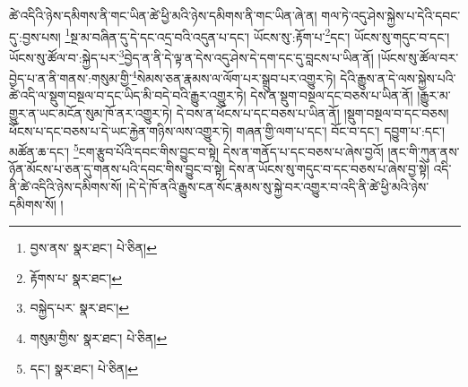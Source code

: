 ཚེ་འདིའི་ཉེས་དམིགས་ནི་གང་ཡིན་ཚེ་ཕྱི་མའི་ཉེས་དམིགས་ནི་གང་ཡིན་ཞེ་ན། གལ་ཏེ་འདུ་ཤེས་སྐྱེས་པ་དེའི་དབང་དུ་:བྱས་པས། \footnote{བྱས་ནས་  སྣར་ཐང་།  པེ་ཅིན། }སྔ་མ་བཞིན་དུ་དེ་དང་འདྲ་བའི་འདུན་པ་དང་། ཡོངས་སུ་:རྟོག་པ་\footnote{རྟོགས་པ་  སྣར་ཐང་། }དང་། ཡོངས་སུ་གདུང་བ་དང་། ཡོངས་སུ་ཚོལ་བ་:སྐྱེད་པར་\footnote{བསྐྱེད་པར་  སྣར་ཐང་། }བྱེད་ན་ནི་དེ་ལྟ་ན་དེས་འདུ་ཤེས་དེ་དག་དང་དུ་བླངས་པ་ཡིན་ནོ། །ཡོངས་སུ་ཚོལ་བར་བྱེད་པ་ན་ནི་གནས་:གསུམ་གྱི་\footnote{གསུམ་གྱིས་  སྣར་ཐང་།  པེ་ཅིན། }སེམས་ཅན་རྣམས་ལ་ལོག་པར་སྒྲུབ་པར་འགྱུར་ཏེ། དེའི་རྒྱུས་ན་དེ་ལས་སྐྱེས་པའི་ཚེ་འདི་ལ་སྡུག་བསྔལ་བ་དང་ཡིད་མི་བདེ་བའི་རྒྱུར་འགྱུར་ཏེ། དེས་ན་སྡུག་བསྔལ་དང་བཅས་པ་ཡིན་ནོ། །རྒྱུར་མ་གྱུར་ན་ཡང་མངོན་སུམ་ཁོ་ནར་འགྱུར་ཏེ། དེ་བས་ན་ཕོངས་པ་དང་བཅས་པ་ཡིན་ནོ། །སྡུག་བསྔལ་བ་དང་བཅས། ཕོངས་པ་དང་བཅས་པ་དེ་ཡང་རྐྱེན་གཉིས་ལས་འགྱུར་ཏེ། གཞན་གྱི་ལག་པ་དང་། བོང་བ་དང་། དབྱུག་པ་:དང་། མཚོན་ཆ་དང་། \footnote{དང་།    སྣར་ཐང་།  པེ་ཅིན། }ངག་རྩུབ་པོའི་དབང་གིས་བྱུང་བ་སྟེ། དེས་ན་གནོད་པ་དང་བཅས་པ་ཞེས་བྱའོ། །ནང་གི་ཀུན་ནས་ཉོན་མོངས་པ་ཅན་དུ་གནས་པའི་དབང་གིས་བྱུང་བ་སྟེ། དེས་ན་ཡོངས་སུ་གདུང་བ་དང་བཅས་པ་ཞེས་བྱ་སྟེ། འདི་ནི་ཚེ་འདིའི་ཉེས་དམིགས་སོ། །དེ་དེ་ཁོ་ནའི་རྒྱུས་ངན་སོང་རྣམས་སུ་སྐྱེ་བར་འགྱུར་བ་འདི་ནི་ཚེ་ཕྱི་མའི་ཉེས་དམིགས་སོ། །
